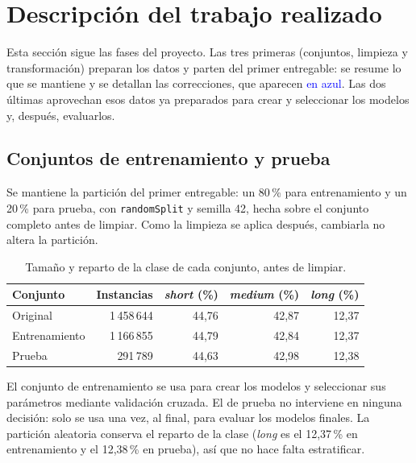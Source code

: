 \documentclass[12pt,a4paper]{article}
\newcommand{\cambio}[1]{\textcolor{blue}{#1}}
\begin{document}
\newpage
\section{Descripción del trabajo realizado}
\label{sec:trabajo}

Esta sección sigue las fases del proyecto. Las tres primeras (conjuntos,
limpieza y transformación) preparan los datos y parten del primer
entregable: se resume lo que se mantiene y se detallan las correcciones,
que aparecen \cambio{en azul}. Las dos últimas aprovechan esos datos ya
preparados para crear y seleccionar los modelos y, después, evaluarlos.

\subsection{Conjuntos de entrenamiento y prueba}
\label{sec:conjuntos}

Se mantiene la partición del primer entregable: un 80\,\% para entrenamiento y un 20\,\% para prueba, con \texttt{randomSplit} y semilla 42, hecha sobre el conjunto completo antes de limpiar. Como la limpieza se aplica después, cambiarla no altera la partición.

\begin{table}[H]
\centering
\small
\begin{tabular}{lrrrr}
\toprule
\textbf{Conjunto} & \textbf{Instancias} & \textbf{\textit{short} (\%)} & \textbf{\textit{medium} (\%)} & \textbf{\textit{long} (\%)} \\
\midrule
Original      & 1\,458\,644 & 44,76 & 42,87 & 12,37 \\
Entrenamiento & 1\,166\,855 & 44,79 & 42,84 & 12,37 \\
Prueba        &   291\,789 & 44,63 & 42,98 & 12,38 \\
\bottomrule
\end{tabular}
\caption{Tamaño y reparto de la clase de cada conjunto, antes de limpiar.}
\label{tab:particion}
\end{table}

El conjunto de entrenamiento se usa para crear los modelos y seleccionar sus parámetros mediante validación cruzada. El de prueba no interviene en ninguna decisión: solo se usa una vez, al final, para evaluar los modelos finales. La partición aleatoria conserva el reparto de la clase (\textit{long} es el 12,37\,\% en entrenamiento y el 12,38\,\% en prueba), así que no hace falta estratificar.
\end{document}
